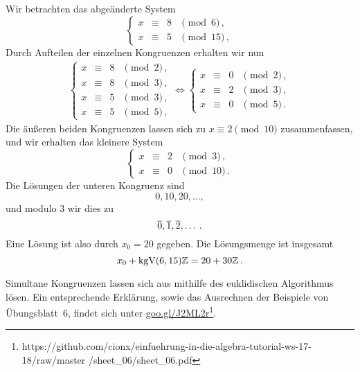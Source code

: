 \begin{example}
  Wir betrachten das abgeänderte System
  \[
    \left\{
      \begin{array}{ccll}
        x &\equiv&  8 & \pmod{6}  \,, \\
        x &\equiv&  5 & \pmod{15} \,,
      \end{array}
    \right.
  \]
  Durch Aufteilen der einzelnen Kongruenzen erhalten wir nun
  \begin{align*}
          \left\{
            \begin{array}{ccll}
              x &\equiv&  8 & \pmod{2}  \,, \\
              x &\equiv&  8 & \pmod{3}  \,, \\
              x &\equiv&  5 & \pmod{3}  \,, \\
              x &\equiv&  5 & \pmod{5}  \,,
            \end{array}
          \right.
    \iff  \left\{
            \begin{array}{ccll}
              x &\equiv&  0 & \pmod{2}  \,, \\
              x &\equiv&  2 & \pmod{3}  \,, \\
              x &\equiv&  0 & \pmod{5}  \,.
            \end{array}
          \right.
  \end{align*}
  Die äußeren beiden Kongruenzen lassen sich zu $x \equiv 2 \pmod{10}$ zusammenfassen, und wir erhalten das kleinere System
  \[
    \left\{
      \begin{array}{ccll}
        x &\equiv&  2 & \pmod{3}  \,, \\
        x &\equiv&  0 & \pmod{10} \,.
      \end{array}
    \right.
  \]
  Die Lösungen der unteren Kongruenz sind
  \[
    0, 10, 20, \dotsc,
  \]
  und modulo $3$ wir dies zu
  \[
    \overline{0},
    \overline{1},
    \overline{2},
    \dotsc.
  \]
  Eine Lösung ist also durch $x_0 = 20$ gegeben.
  Die Lösungsmenge ist insgesamt
  \[
      x_0 + \operatorname{kgV}(6,15)\mathbb{Z}
    = 20 + 30\mathbb{Z} \,.
  \]
\end{example}

\begin{remark}
  Simultane Kongruenzen lassen sich aus mithilfe des euklidischen Algorithmus lösen.
  Ein entsprechende Erklärung, sowie das Ausrechnen der Beispiele von Übungsblatt~6, findet sich unter \url{goo.gl/J2ML2r}\footnote{https://github.com/cionx/einfuehrung-in-die-algebra-tutorial-ws-17-18/raw/master
  /sheet\_06/sheet\_06.pdf}.
\end{remark}












